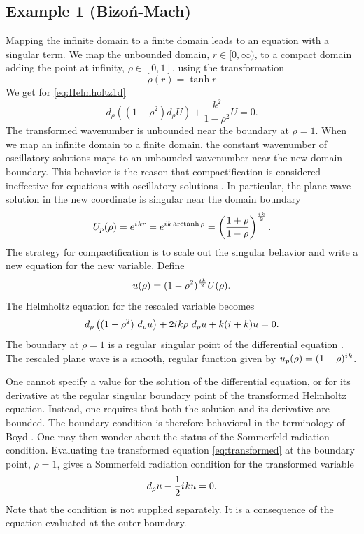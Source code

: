 \documentclass[final,onefignum,onetabnum]{siamart190516}
\newcommand{\be}{\begin{equation}}
\newcommand{\ee}{\end{equation}}
\newcommand{\iu}{{i\mkern1mu}}
\DeclareMathOperator\arctanh{arctanh}
\begin{document}
\subsection{Example 1 (Bizoń-Mach)}
Mapping the infinite domain to a finite domain leads to an equation with a singular term. We map the unbounded domain, $r\in[0,\infty)$, to a compact domain adding the point at infinity, $\rho\in[0,1]$, using the transformation
\be\label{eq:space_compact1d} \rho(r) = \tanh r \ee
We get for \eqref{eq:Helmholtz1d}
\be\label{eq:simple} 
d_\rho\left((1-\rho^2) d_\rho U \right)+ \frac{k^2}{1-\rho^2} U = 0. 
\ee
The transformed wavenumber is unbounded near the boundary at $\rho=1$. When we map an infinite domain to a finite domain, the constant wavenumber of oscillatory solutions maps to an unbounded wavenumber near the new domain boundary. This behavior is the reason that compactification is considered ineffective for equations with oscillatory solutions \cite{GroschOrszag77, shen2014approximations}. In particular, the plane wave solution in the new coordinate is singular near the domain boundary
\[ U_p(\rho)=e^{\iu k r} =  e^{\iu k \arctanh\rho} = \left(\frac{1+\rho}{1-\rho}\right)^{\frac{\iu k}{2}}.\]
The strategy for compactification is to scale out the singular behavior and write a new equation for the new variable. Define
\be\label{eq:trafo1d} u(\rho) = (1-\rho^2)^{\frac{\iu k}{2}} U(\rho). \ee
The Helmholtz equation for the rescaled variable becomes
\be\label{eq:transformed} 
d_\rho\left((1-\rho^2) \ d_\rho u \right) + 2\iu k \rho\ d_\rho u + k (\iu+k) u = 0. 
\ee
The boundary at $\rho=1$ is a regular singular point of the differential equation \cite{powers2009boundary}. The rescaled plane wave is a smooth, regular function given by $u_p(\rho) = (1+\rho)^{\iu k}$. 

One cannot specify a value for the solution of the differential equation, or for its derivative at the regular singular boundary point of the transformed Helmholtz equation. Instead, one requires that both the solution and its derivative are bounded. The boundary condition is therefore behavioral in the terminology of Boyd \cite{boyd2001chebyshev}. One may then wonder about the status of the Sommerfeld radiation condition. Evaluating the transformed equation \eqref{eq:transformed} at the boundary point, $\rho=1$, gives a Sommerfeld radiation condition for the transformed variable
\be\label{eq:simple_sommerfeld} d_\rho u - \frac{1}{2} \iu k u = 0. \ee
Note that the condition is not supplied separately. It is a consequence of the equation evaluated at the outer boundary.
\end{document}
